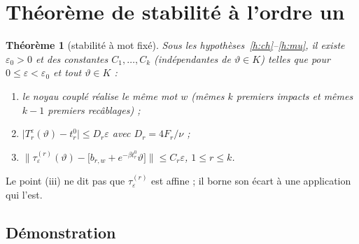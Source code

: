 \documentclass[11pt,a4paper]{article}
\newtheorem{theoreme}{Théorème}
\theoremstyle{remark}
\theoremstyle{definition}
\newcommand{\eps}{\varepsilon}
\newcommand{\vth}{\vartheta}
\begin{document}
\section{Théorème de stabilité à l'ordre un}

\begin{theoreme}[stabilité à mot fixé]\label{thm:stab}
Sous les hypothèses~\ref{h:ch}--\ref{h:mu}, il existe $\eps_0>0$ et des constantes $C_1,\dots,C_k$ (indépendantes de $\vth\in K$) telles que pour $0\le\eps<\eps_0$ et tout $\vth\in K$ :
\begin{enumerate}[label=(\roman*)]
\item le noyau couplé réalise le même mot $w$ (mêmes $k$ premiers impacts et mêmes $k-1$ premiers recâblages) ;
\item $\lvert T_r^\eps(\vth)-t_r^0\rvert\le D_r\eps$ avec $D_r=4F_r/\nu$ ;
\item $\displaystyle\bigl\lVert\tau^{(r)}_\eps(\vth)-\bigl[b_{r,w}+e^{-\beta t_r^0}\vth\bigr]\bigr\rVert\le C_r\eps$, \qquad $1\le r\le k$.
\end{enumerate}
\end{theoreme}

Le point (iii) ne dit pas que $\tau^{(r)}_\eps$ est affine ; il borne son écart à une application qui l'est.

\subsection{Démonstration}
\end{document}
